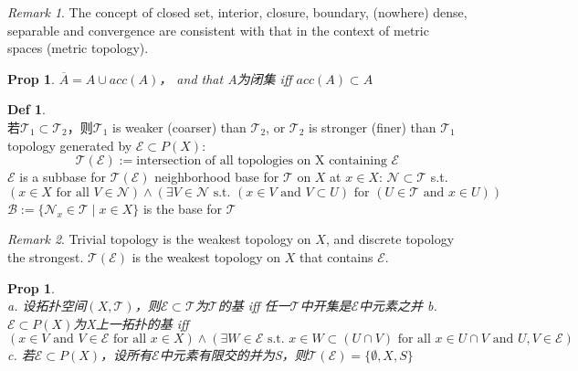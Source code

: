 \documentclass[hidelinks]{article}
\theoremstyle{definition}
\newtheorem*{defin}{Def}
\theoremstyle{plain}
\newtheorem{proposition}[theorem]{Prop}
\theoremstyle{remark}
\newtheorem*{remark}{Remark}
\begin{document}
\begin{remark}
The concept of closed set, interior, closure, boundary, (nowhere) dense, separable and convergence are consistent with that in the context of metric spaces (metric topology).
\end{remark}

\begin{proposition}
$\overline{A}=A\cup acc(A)$， and that A为闭集 \textrm{iff} $acc(A)\subset A$
\end{proposition}

\begin{defin}~\\
若$\mathscr{T}_1\subset\mathscr{T}_2$，则$\mathscr{T}_1$ is weaker (coarser) than $\mathscr{T}_2$, or $\mathscr{T}_2$ is stronger (finer) than $\mathscr{T}_1$ \newline
topology generated by $\mathscr{E}\subset P(X)$:
$$\mathscr{T}(\mathscr{E}):= \textrm{intersection of all topologies on X containing }\mathscr{E}$$
$\mathscr{E}$ is a subbase for $\mathscr{T}(\mathscr{E})$ \newline
neighborhood base for $\mathscr{T}$ on $X$ at $x\in X$: $\mathscr{N}\subset \mathscr{T}$ s.t.
$$(x\in X \textrm{ for all } V\in \mathscr{N})\wedge(\exists V\in \mathscr{N} \textrm{ s.t. }(x\in V \textrm{ and } V\subset U)\textrm{ for }(U\in \mathscr{T} \textrm{ and } x\in U))$$
$\mathscr{B}:=\{\mathscr{N}_x\in \mathscr{T}\mid x\in X\}$ is the base for $\mathscr{T}$
\end{defin}

\begin{remark}
Trivial topology is the weakest topology on $X$, and discrete topology the strongest. $\mathscr{T}(\mathscr{E})$ is the weakest topology on $X$ that contains $\mathscr{E}$.
\end{remark}

\begin{proposition}~\\
a. 设拓扑空间$(X,\mathscr{T})$，则$\mathscr{E}\subset \mathscr{T}$为$\mathscr{T}$的基 \textrm{iff} 任一$\mathscr{T}$中开集是$\mathscr{E}$中元素之并 \newline
b. $\mathscr{E}\subset P(X)$为X上一拓扑的基 \textrm{iff} 
\[
(x\in V\textrm{ and }V\in \mathscr{E}\textrm{ for all } x\in X)\wedge(\exists W\in \mathscr{E}\textrm{ s.t. }x\in W\subset (U\cap V)\textrm{ for all }x\in U\cap V\textrm{ and }U,V\in \mathscr{E})
\]
c. 若$\mathscr{E}\subset P(X)$，设所有$\mathscr{E}$中元素有限交的并为S，则$\mathscr{T}(\mathscr{E})=\{\emptyset,X,S\}$
\end{proposition}
\end{document}
